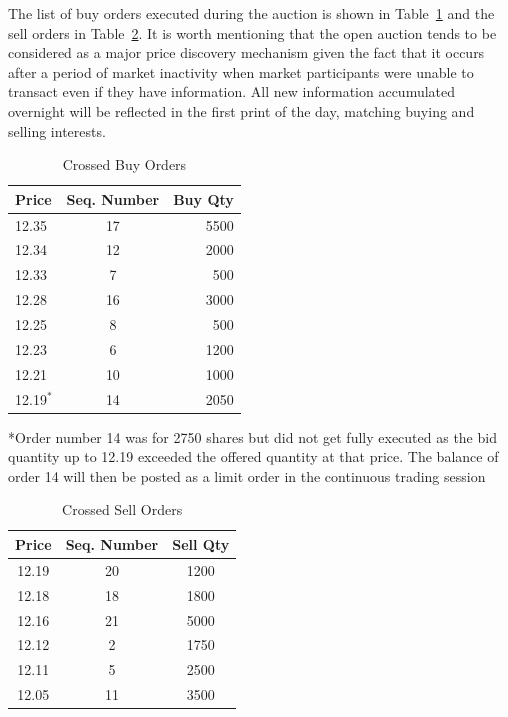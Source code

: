 The list of buy orders executed during the auction is shown in Table~\ref{tab:openAuct4} and the sell orders in Table~\ref{tab:openAuct5}. It is worth mentioning that the open auction tends to be considered as a major price discovery mechanism given the fact that it occurs after a period of market inactivity when market participants were unable to transact even if they have information. All new information accumulated overnight will be reflected in the first print of the day, matching buying and selling interests.  


	\begin{table}[!ht]
   	\centering
   	\caption{Crossed Buy Orders \label{tab:openAuct4}}
   	\begin{tabular}{lcr} 
	Price & Seq. Number & Buy Qty  \\ \hline
	12.35 &  17 & 5500 \\
	12.34 & 12 & 2000\\	
	12.33 & 7  & 500\\			
	12.28 &  16 & 3000\\	
	12.25 & 8 & 500\\	
	12.23 & 6 & 1200\\		
	12.21  & 10& 1000\\		
	12.19$^*$ &  14  & 2050 		
   	\end{tabular}
	\begin{minipage}[t]{1\textwidth}
	\small{*Order number 14 was for 2750 shares but did not get fully executed as the bid quantity up to 12.19 exceeded the offered quantity at that price. The balance of order 14 will then be posted as a limit order in the continuous trading session}
	\end{minipage}   
	\end{table}

	
	\begin{table}[!ht]
   	\centering
   	\caption{Crossed Sell Orders\label{tab:openAuct5}}
   	\hspace*{-3.3cm}
   	\begin{tabular}{ccc} 
	Price & Seq. Number & Sell Qty  \\ \hline
	12.19 &  20 & 1200 \\
	12.18 &  18 & 1800 \\
	12.16 &  21 & 5000 \\
	12.12 & 2 & 1750 \\		
	12.11 & 5 & 2500 \\				
	12.05 & 11 & 3500 		
   	\end{tabular}
	\end{table}	


